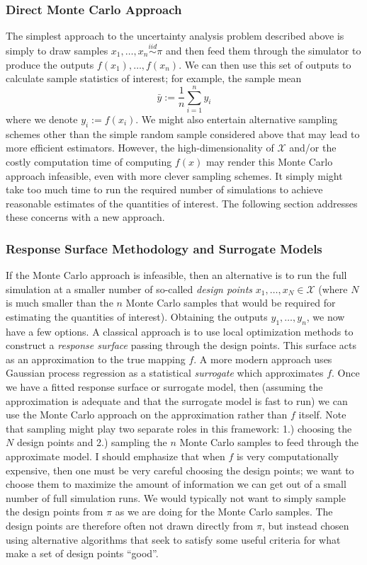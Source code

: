 \documentclass[12pt]{article}
\begin{document}
\subsubsection{Direct Monte Carlo Approach}
The simplest approach to the uncertainty analysis problem described above 
is simply to draw samples $x_1, \dots, x_n \overset{iid}{\sim} \pi$ and then feed them through the simulator to produce the outputs 
$f(x_1), \dots, f(x_n)$. We can then use this set of outputs to calculate sample statistics of interest; for example, the sample mean
\[\bar{y} := \frac{1}{n} \sum_{i = 1}^{n} y_i\]
where we denote $y_i := f(x_i)$. 
We might also entertain alternative sampling schemes other than the simple random sample considered above that may lead to more efficient estimators. 
However, the high-dimensionality of $\mathcal{X}$ and/or the costly computation time of computing $f(x)$ may render this Monte Carlo approach infeasible, 
even with more clever sampling schemes. It simply might take too much time to run the required number of simulations to achieve reasonable estimates of 
the quantities of interest. The following section addresses these concerns with a new approach. 

\subsubsection{Response Surface Methodology and Surrogate Models}
If the Monte Carlo approach is infeasible, then an alternative is to run the full simulation at a smaller number of so-called \textit{design points}
$x_1, \dots, x_N \in \mathcal{X}$ (where $N$ is much smaller than the $n$ Monte Carlo samples that would be required for estimating the 
quantities of interest). Obtaining the outputs $y_1, \dots, y_n$, we now have a few options. A classical approach is to use local optimization 
methods to construct a \textit{response surface} passing through the design points. This surface acts as an approximation to the true mapping $f$. 
A more modern approach uses Gaussian process regression as a statistical \textit{surrogate} which approximates $f$. Once we have a fitted 
response surface or surrogate model, then (assuming the approximation is adequate and that the surrogate model is fast to run) 
we can use the Monte Carlo approach on the approximation rather than $f$ itself. Note that sampling might play two separate roles in this framework: 
1.) choosing the $N$ design points and 2.) sampling the $n$ Monte Carlo samples to feed through the approximate model. I should emphasize that when 
$f$ is very computationally expensive, then one must be very careful choosing the design points; we want to choose them to maximize the amount of 
information we can get out of a small number of full simulation runs. We would typically not want to simply sample the design points from $\pi$ as we 
are doing for the Monte Carlo samples. The design points are therefore often not drawn directly from $\pi$, but instead chosen using alternative algorithms
that seek to satisfy some useful criteria for what make a set of design points ``good''. 
\end{document}
